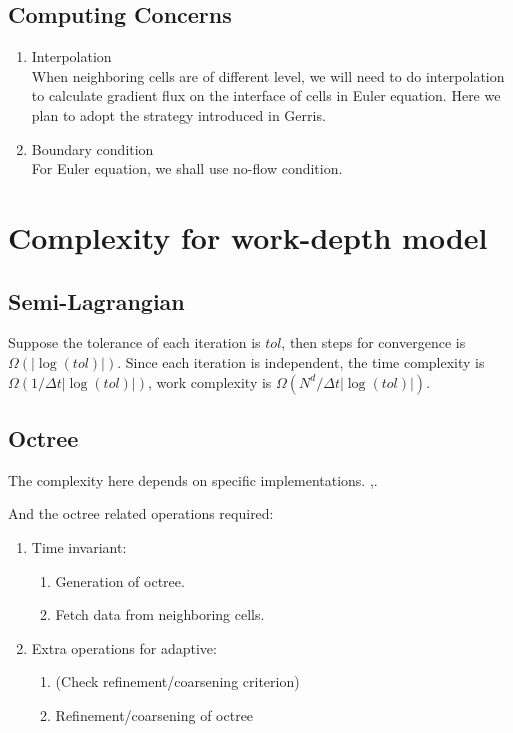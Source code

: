\documentclass[PROP,PDF]{prop} %
\begin{document}
\subsection{Computing Concerns}
\begin{enumerate}
\item Interpolation\\
When neighboring cells are of different level, we will need to do interpolation to calculate gradient flux on the interface of cells in Euler equation. Here we plan to adopt the strategy introduced in Gerris.
\item Boundary condition\\
For Euler equation, we shall use no-flow condition.
\end{enumerate}

\section{Complexity for work-depth model}

\subsection{Semi-Lagrangian}
Suppose the tolerance of each iteration is $tol$, then steps for convergence is $\Omega(|\log(tol)|)$. Since each iteration is independent, the time complexity is $\Omega(1/\Delta t |\log(tol)|)$, work complexity is $\Omega(N^d/\Delta t |\log(tol)|)$. 
\subsection{Octree}
The complexity here depends on specific implementations. \cite{OM1},\cite{OM2}.

And the octree related operations required:
\begin{enumerate}
\item Time invariant:
\begin{enumerate}
\item Generation of octree.
\item Fetch data from neighboring cells.
\end{enumerate}
\item Extra operations for adaptive:
\begin{enumerate}
\item (Check refinement/coarsening criterion)
\item Refinement/coarsening of octree
\end{enumerate}
\end{enumerate}
\end{document}
